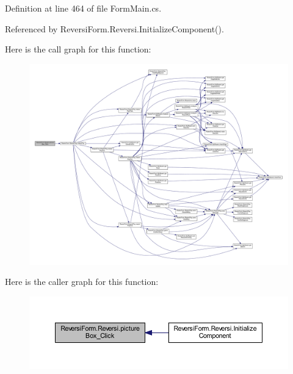 Definition at line 464 of file Form\+Main.\+cs.



Referenced by Reversi\+Form.\+Reversi.\+Initialize\+Component().

Here is the call graph for this function\+:
\nopagebreak
\begin{figure}[H]
\begin{center}
\leavevmode
\includegraphics[width=350pt]{class_reversi_form_1_1_reversi_afaa2a98428f4d9eab723fb71f8cb3e29_cgraph}
\end{center}
\end{figure}
Here is the caller graph for this function\+:
\nopagebreak
\begin{figure}[H]
\begin{center}
\leavevmode
\includegraphics[width=350pt]{class_reversi_form_1_1_reversi_afaa2a98428f4d9eab723fb71f8cb3e29_icgraph}
\end{center}
\end{figure}
\mbox{\label{class_reversi_form_1_1_reversi_ac4868f12e6f15387f8f39f5f1934e610}} 
